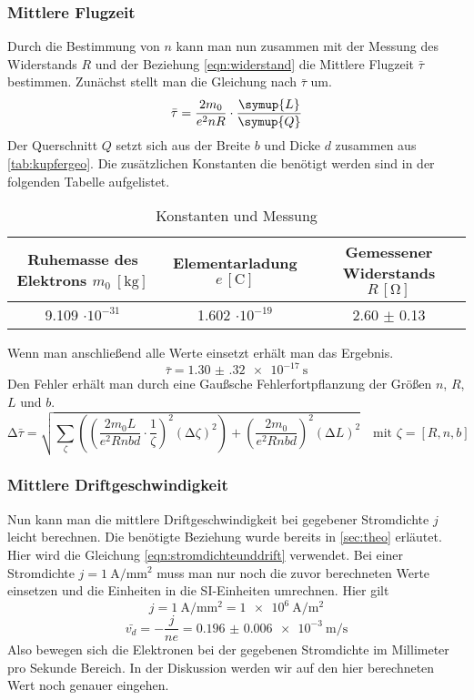 \subsubsection{Mittlere Flugzeit}
Durch die Bestimmung von $n$ kann man nun zusammen mit der Messung des Widerstands $R$ und der Beziehung \eqref{eqn:widerstand} die Mittlere Flugzeit $\bar{\tau}$ bestimmen. 
Zunächst stellt man die Gleichung nach $\bar{\tau}$ um.
\begin{equation}
\bar{\tau} = \frac{2m_{0}}{e^{2}n R} \cdot \frac{\symup{L}}{\symup{Q}}
\end{equation}
Der Querschnitt $Q$ setzt sich aus der Breite $b$ und Dicke $d$ zusammen aus \ref{tab:kupfergeo}.
Die zusätzlichen Konstanten die benötigt werden sind in der folgenden Tabelle aufgelistet.
\begin{table}
  \centering
  \caption{Konstanten und Messung}
  \label{tab:konstantenrechnung}
  \begin{tabular}{c c c}
    Ruhemasse des Elektrons {$m_{0} \: [\si{\kilo\gram}]$} & Elementarladung {$e \, [\si{\coulomb}]$} & Gemessener Widerstands {$R \, [\si{\ohm}]$}\\
    \midrule
    9.109 $\cdot 10^{-31}$   & 1.602 $\cdot 10^{-19}$ & 2.60 $\pm$ 0.13\\
    \bottomrule
  \end{tabular}
\end{table}
Wenn man anschließend alle Werte einsetzt erhält man das Ergebnis.
\begin{equation}
\bar{\tau} = \SI{1.30(32)e-17}{\second}
\end{equation}
Den Fehler erhält man durch eine Gaußsche Fehlerfortpflanzung der Größen $n$, $R$, $L$ und $b$.
\begin{equation}
\increment \bar{\tau} = \sqrt{\sum_{\zeta}\left( \left( \frac{2m_{0}L}{e^{2}Rnbd} \cdot \frac{1}{\zeta}\right)^{2} (\increment \zeta)^2 \right) + \left( \frac{2m_{0}}{e^{2}Rnbd} \right)^{2} (\increment L)^{2}} \quad \text{mit } \zeta =[R, n, b]
\end{equation}

\subsubsection{Mittlere Driftgeschwindigkeit}
Nun kann man die mittlere Driftgeschwindigkeit bei gegebener Stromdichte $j$ leicht berechnen. Die benötigte Beziehung wurde bereits in \ref{sec:theo} erläutet.
Hier wird die Gleichung \eqref{eqn:stromdichteunddrift} verwendet. Bei einer Stromdichte $j = \SI{1}{\ampere\per\milli\meter\squared}$ muss man nur noch die zuvor berechneten Werte einsetzen und
die Einheiten in die SI-Einheiten umrechnen. Hier gilt
\begin{equation}
j = \SI{1}{\ampere\per\milli\meter\squared} = \SI{1e6}{\ampere\per\meter\squared}
\end{equation}
\begin{equation}
\bar{v_{d}} = - \frac{j}{n e} = \SI{0.196(6)e-3}{\meter\per\second}
\end{equation}
Also bewegen sich die Elektronen bei der gegebenen Stromdichte im Millimeter pro Sekunde Bereich. In der Diskussion werden wir auf den 
hier berechneten Wert noch genauer eingehen.

